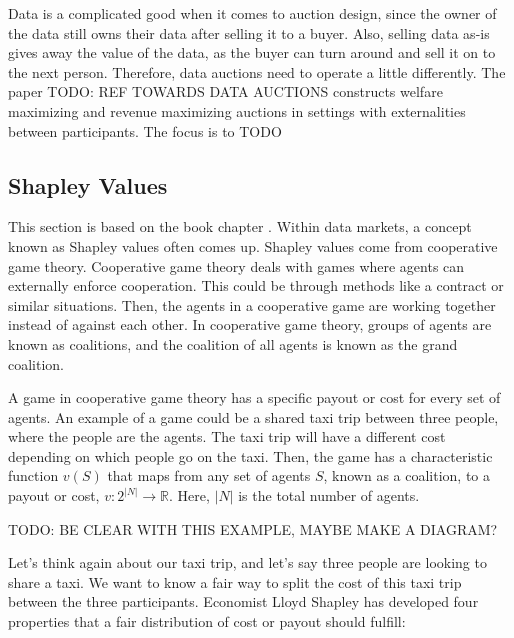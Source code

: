 
Data is a complicated good when it comes to auction design, since the owner of
the data still owns their data after selling it to a buyer. Also, selling data
as-is gives away the value of the data, as the buyer can turn around and sell
it on to the next person. Therefore, data auctions need to operate a little
differently. The paper TODO: REF TOWARDS DATA AUCTIONS constructs welfare
maximizing and revenue maximizing auctions in settings with externalities
between participants. The focus is to TODO

\subsection{Shapley Values}

This section is based on the book chapter
\cite{cooperative_game_theory_toru_hokari}. Within data markets, a concept
known as Shapley values often comes up. Shapley values come from cooperative
game theory. Cooperative game theory deals with games where agents can
externally enforce cooperation. This could be through methods like a contract
or similar situations. Then, the agents in a cooperative game are working
together instead of against each other. In cooperative game theory, groups of
agents are known as coalitions, and the coalition of all agents is known as the
grand coalition.

A game in cooperative game theory has a specific payout or cost for every set
of agents. An example of a game could be a shared taxi trip between three
people, where the people are the agents. The taxi trip will have a different
cost depending on which people go on the taxi. Then, the game has a
characteristic function $v(S)$ that maps from any set of agents $S$, known as a
coalition, to a payout or cost, $v: 2^{|N|} \rightarrow \mathbb R$. Here, $|N|$
is the total number of agents.

TODO: BE CLEAR WITH THIS EXAMPLE, MAYBE MAKE A DIAGRAM?

Let's think again about our taxi trip, and let's say three people are looking
to share a taxi. We want to know a fair way to split the cost of this taxi trip
between the three participants. Economist Lloyd Shapley has developed four
properties that a fair distribution of cost or payout should fulfill: %

